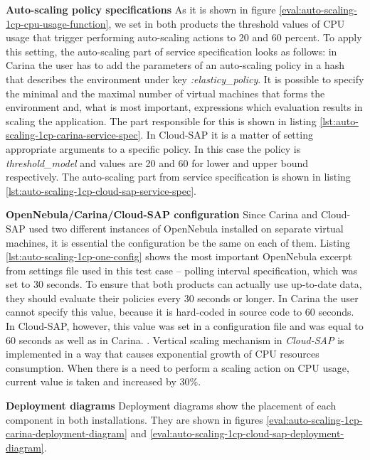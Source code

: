 \begin{asparaenum}
  \item[\textbf{Auto-scaling policy specifications}] As it is shown in figure \ref{eval:auto-scaling-1cp-cpu-usage-function}, we set in both products the threshold values of CPU usage that trigger performing auto-scaling actions to 20 and 60 percent. To apply this setting, the auto-scaling part of service specification looks as follows: in Carina the user has to add the parameters of an auto-scaling policy in a hash that describes the environment under key \emph{:elasticy\_policy}. It is possible to specify the minimal and the maximal number of virtual machines that forms the environment and, what is most important, expressions which evaluation results in scaling the application. The part responsible for this is shown in listing \ref{lst:auto-scaling-1cp-carina-service-spec}. In Cloud-SAP it is a matter of setting appropriate arguments to a specific policy. In this case the policy is \emph{threshold\_model} and values are 20 and 60 for lower and upper bound respectively. The auto-scaling part from service specification is shown in listing \ref{lst:auto-scaling-1cp-cloud-sap-service-spec}. 
  \item[\textbf{OpenNebula/Carina/Cloud-SAP configuration}] Since Carina and Cloud-SAP used two different instances of OpenNebula installed on separate virtual machines, it is essential the configuration be the same on each of them. Listing \ref{lst:auto-scaling-1cp-one-config} shows the most important OpenNebula excerpt from settings file used in this test case -- polling interval specification, which was set to 30 seconds. To ensure that both products can actually use up-to-date data, they should evaluate their policies every 30 seconds or longer. In Carina the user cannot specify this value, because it is hard-coded in source code to 60 seconds. In Cloud-SAP, however, this value was set in a configuration file and was equal to 60 seconds as well as in Carina. . Vertical scaling mechanism in \emph{Cloud-SAP} is implemented in a way that causes exponential growth of CPU resources consumption. When there is a need to perform a scaling action on CPU usage, current value is taken and increased by 30\%.
  \item[\textbf{Deployment diagrams}] Deployment diagrams show the placement of each component in both installations. They are shown in figures \ref{eval:auto-scaling-1cp-carina-deployment-diagram} and \ref{eval:auto-scaling-1cp-cloud-sap-deployment-diagram}.


\end{asparaenum}
